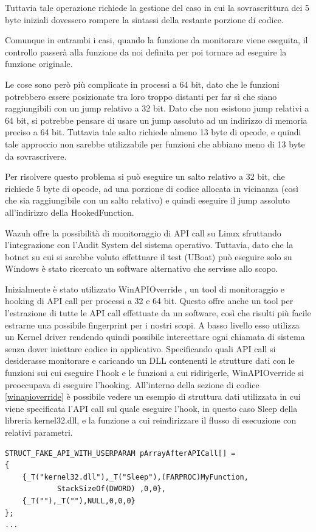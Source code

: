 Tuttavia tale operazione richiede la gestione del caso in cui la sovrascrittura dei 5 byte iniziali dovessero rompere la sintassi della restante porzione di codice.

Comunque in entrambi i casi, quando la funzione da monitorare viene eseguita, il controllo passerà alla funzione da noi definita per poi tornare ad eseguire la funzione originale.

Le cose sono però più complicate in processi a 64 bit, dato che le funzioni potrebbero essere posizionate tra loro troppo distanti per far sì che siano raggiungibili con un jump relativo a 32 bit. Dato che non esistono jump relativi a 64 bit, si potrebbe pensare di usare un jump assoluto ad un indirizzo di memoria preciso a 64 bit.  Tuttavia tale salto richiede almeno 13 byte di opcode, e quindi tale approccio non sarebbe utilizzabile per funzioni che abbiano meno di 13 byte da sovrascrivere.

Per risolvere questo problema si può eseguire un salto relativo a 32 bit, che richiede 5 byte di opcode, ad una porzione di codice allocata in  vicinanza (così che sia raggiungibile con un salto relativo) e quindi eseguire il jump assoluto all'indirizzo della HookedFunction.

\smallskip


Wazuh offre la possibilità di monitoraggio di API call su Linux sfruttando l'integrazione con l'Audit System del sistema operativo. Tuttavia, dato che la botnet su cui si sarebbe voluto effettuare il test (UBoat) può eseguire solo su Windows è stato ricercato un software alternativo che servisse allo scopo.

Inizialmente è stato utilizzato WinAPIOverride \cite{winapioverride}, un tool di monitoraggio e hooking di API call per processi a 32 e 64 bit.
Questo offre anche un tool per l'estrazione di tutte le API call effettuate da un software, così che risulti più facile estrarne una possibile fingerprint per i nostri scopi.
A basso livello esso utilizza un Kernel driver rendendo quindi possibile intercettare ogni chiamata di sistema senza dover iniettare codice in applicativo.
Specificando quali API call si desiderasse monitorare e caricando un DLL contenenti le strutture dati con le funzioni sui cui eseguire l'hook e le funzioni a cui ridirigerle, WinAPIOverride si preoccupava di eseguire l'hooking.
All'interno della sezione di codice \ref{winapioverride} è possibile vedere un esempio di struttura dati utilizzata in cui viene specificata l'API call sul quale eseguire l'hook, in questo caso Sleep della libreria kernel32.dll, e la funzione a cui reindirizzare il flusso di esecuzione con relativi parametri.
\lstset{xleftmargin=0cm}
\begin{lstlisting}[frame=single,caption={esempio di struttura dati per hook in WinAPIOverride.},captionpos=b,label={winapioverride}]
STRUCT_FAKE_API_WITH_USERPARAM pArrayAfterAPICall[] =
{    
	{_T("kernel32.dll"),_T("Sleep"),(FARPROC)MyFunction,
            StackSizeOf(DWORD) ,0,0},
	{_T(""),_T(""),NULL,0,0,0}
};
...
\end{lstlisting}

